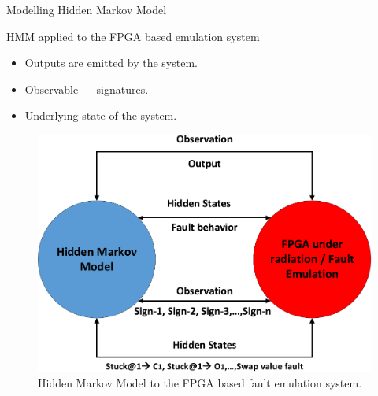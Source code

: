 \documentclass[aspectratio=1610]{beamer}
\begin{document}
\begin{frame}{Modelling Hidden Markov Model}

\begin{block}{HMM applied to the FPGA based emulation system}

\end{block}

\begin{itemize}

\item Outputs are emitted by the system.
\item Observable --- signatures.
\item Underlying state of the system.



\end{itemize}




\begin{figure}[tb!]
 \centering
  \captionsetup{justification=centering}    
   \includegraphics[scale=0.37]{Figures/HMM-air.pdf}
   \caption{Hidden Markov Model to the FPGA based fault emulation system.}
\label{fig:HMM-air}
\end{figure}
\end{frame}
\end{document}

